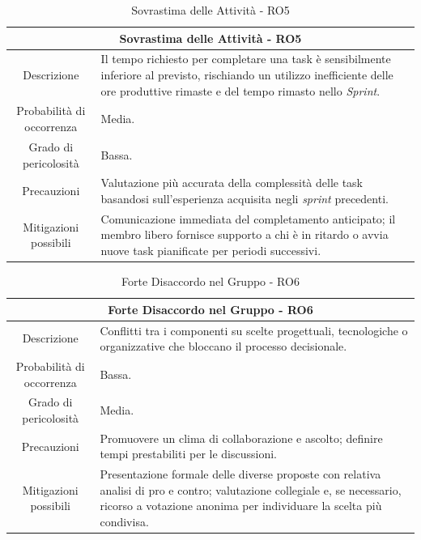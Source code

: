 \documentclass[12pt, a4paper]{article}
\begin{document}
\begin{table}[H]
    \centering
    \renewcommand{\arraystretch}{1.3}
    \begin{tabularx}{\textwidth}{|c|X|}
        \hline
        \multicolumn{2}{|c|}{\textbf{Sovrastima delle Attività - RO5}} \\ \hline
        Descrizione &
        Il tempo richiesto per completare una 
task è sensibilmente inferiore al
        previsto, rischiando un utilizzo inefficiente delle ore produttive
        rimaste e del tempo rimasto nello \textit{Sprint}.
\\ \hline
        Probabilità di occorrenza & Media.
\\ \hline
        Grado di pericolosità & Bassa.
\\ \hline
        Precauzioni & Valutazione più accurata della complessità delle task basandosi sull'esperienza acquisita negli \textit{sprint} precedenti.
\\ \hline
        Mitigazioni possibili & 
        Comunicazione immediata del completamento anticipato;
il membro libero
        fornisce supporto a chi è in ritardo o avvia nuove task pianificate per
        periodi successivi.\\ \hline
    \end{tabularx}
    \caption{Sovrastima delle Attività - RO5}
\end{table}

\begin{table}[H]
    \centering
    \renewcommand{\arraystretch}{1.3}
    \begin{tabularx}{\textwidth}{|c|X|}
        \hline
        \multicolumn{2}{|c|}{\textbf{Forte Disaccordo nel Gruppo - RO6}} \\ \hline
        Descrizione & 
        Conflitti tra i 
componenti su scelte progettuali, tecnologiche o
        organizzative che bloccano il processo decisionale.
\\ \hline
        Probabilità di occorrenza & Bassa.
\\ \hline
        Grado di pericolosità & Media.
\\ \hline
        Precauzioni &
        Promuovere un clima di collaborazione e ascolto;
definire tempi
        prestabiliti per le discussioni.
\\ \hline
        Mitigazioni possibili & 
        Presentazione formale delle diverse proposte con relativa analisi di pro
        e contro;
valutazione collegiale e, se necessario, ricorso a votazione
        anonima per individuare la scelta più condivisa.\\ \hline
    \end{tabularx}
    \caption{Forte Disaccordo nel Gruppo - RO6}
\end{table}
\end{document}
